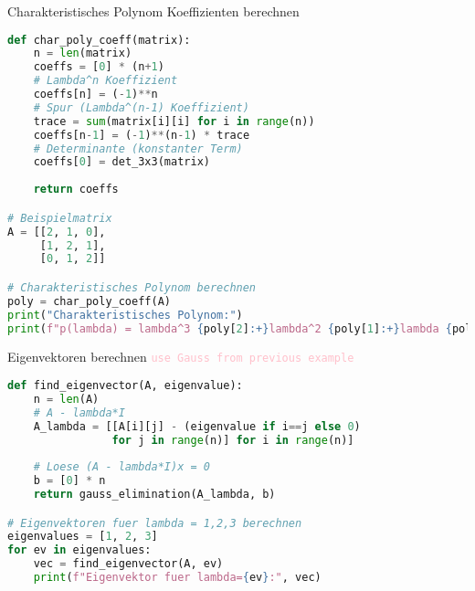 \begin{examplecode}{Charakteristisches Polynom Koeffizienten berechnen}
\begin{lstlisting}[language=Python, style=basesmol]
def char_poly_coeff(matrix):
    n = len(matrix)
    coeffs = [0] * (n+1)
    # Lambda^n Koeffizient
    coeffs[n] = (-1)**n
    # Spur (Lambda^(n-1) Koeffizient)
    trace = sum(matrix[i][i] for i in range(n))
    coeffs[n-1] = (-1)**(n-1) * trace
    # Determinante (konstanter Term)
    coeffs[0] = det_3x3(matrix)
    
    return coeffs

# Beispielmatrix
A = [[2, 1, 0],
     [1, 2, 1],
     [0, 1, 2]]

# Charakteristisches Polynom berechnen
poly = char_poly_coeff(A)
print("Charakteristisches Polynom:")
print(f"p(lambda) = lambda^3 {poly[2]:+}lambda^2 {poly[1]:+}lambda {poly[0]:+}")
\end{lstlisting}
\end{examplecode}

\begin{examplecode}{Eigenvektoren berechnen} \textcolor{pink}{\texttt{use Gauss from previous example}} 
\begin{lstlisting}[language=Python, style=basesmol]
def find_eigenvector(A, eigenvalue):
    n = len(A)
    # A - lambda*I
    A_lambda = [[A[i][j] - (eigenvalue if i==j else 0) 
                for j in range(n)] for i in range(n)]
    
    # Loese (A - lambda*I)x = 0
    b = [0] * n
    return gauss_elimination(A_lambda, b)

# Eigenvektoren fuer lambda = 1,2,3 berechnen
eigenvalues = [1, 2, 3]
for ev in eigenvalues:
    vec = find_eigenvector(A, ev)
    print(f"Eigenvektor fuer lambda={ev}:", vec)
\end{lstlisting}
\end{examplecode}

